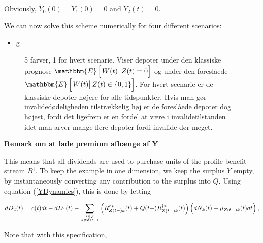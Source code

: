 \documentclass{book}
\newcommand{\1}[1]{\mathbbm{1}_{\left\lbrace #1 \right\rbrace}}
\newcommand{\econd}[2][def]{\mathbbm{E} \left[ \left. #1 \right| #2 \right]}
\theoremstyle{break}
\theoremstyle{remark}
\numberwithin{equation}{section}
\begin{document}
Obviously, $\tilde{Y}_0(0)=\tilde{Y}_1(0)=0$ and $\tilde{Y}_2(t)=0$.

We can now solve this scheme numerically for four different scenarios:

\begin{itemize}
	\item g
\end{itemize}

\begin{figure}[H]
	\caption{5 farver, 1 for hvert scenarie. Viser depoter under den klassiske prognose $\econd[W(t)]{Z(t) = 0}$ og under den foreslåede $\econd[W(t)]{Z(t) \in \{0,1\}}$. For hvert scenarie er de klassiske depoter højere for alle tidspunkter. Hvis man gør invalidedødeligheden tilstrækkelig høj er de foreslåede depoter dog højest, fordi det ligefrem er en fordel at være i invalidetilstanden idet man arver mange flere depoter fordi invalide dør meget.}
\end{figure}





\textbf{Remark om at lade premium afhænge af Y}

This means that all dividends are used to purchase units of the profile benefit stream $B^\dagger$. To keep the example in one dimension, we keep the surplus $Y$ empty, by instantaneously converting any contribution to the surplus into $Q$. Using equation (\ref{YDynamics}), this is done by letting

\begin{align*}
	dD_2(t) = c(t)dt - dD_1(t) - \sum_{k \in \mathcal{J} \atop k \neq Z(t-)} \left( R_{Z(t-)k}^{\circ*}(t) + Q(t-) R_{Z(t-)k}^{\dagger*}(t) \right) \left( dN_k(t) - \mu_{Z(t-)k}(t) dt \right),
\end{align*}

Note that with this specification,
\end{document}
